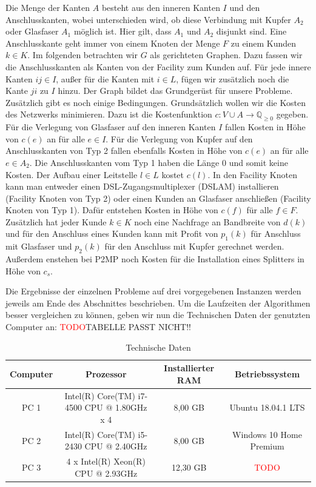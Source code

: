 \documentclass[11pt,a4paper]{article}
\newcommand{\Q}{\mathbb{Q}}
\newcommand{\TODO}{\textcolor{red}{TODO}}
\theoremstyle{my_th_style1}
\begin{document}
Die Menge der Kanten $A$ besteht aus den inneren Kanten $I$ und den Anschlusskanten, wobei unterschieden wird, ob diese Verbindung mit Kupfer $A_2$ oder Glasfaser $A_1$ möglich ist. Hier gilt, dass $A_1$ und $A_2$ disjunkt sind.
Eine Anschlusskante geht immer von einem Knoten der Menge $F$ zu einem Kunden $k \in K$. 
Im folgenden betrachten wir $G$ als gerichteten Graphen. Dazu fassen wir die Anschlusskanten als Kanten von der Facility zum Kunden auf. Für jede innere Kanten $ij \in I$, außer für die Kanten mit $i \in L$, fügen wir zusätzlich noch die Kante $ji$ zu $I$ hinzu.
Der Graph bildet das Grundgerüst für unsere Probleme. Zusätzlich gibt es noch einige Bedingungen. Grundsätzlich wollen wir die Kosten des Netzwerks minimieren. 
Dazu ist die Kostenfunktion $c: V \cup A \rightarrow \Q_{\geq 0}$ gegeben.
Für die Verlegung von Glasfaser auf den inneren Kanten $I$ fallen Kosten in Höhe von $c(e)$ an für alle $e \in I$. 
Für die Verlegung von Kupfer auf den Anschlusskanten von Typ 2 fallen ebenfalls Kosten in Höhe von $c(e)$ an für alle $e \in A_2$. 
Die  Anschlusskanten vom Typ 1 haben die Länge 0 und somit keine Kosten.
Der Aufbau einer Leitstelle $ l\in L$ kostet $c(l)$. 
In den Facility Knoten kann man entweder einen DSL-Zugangsmultiplexer (DSLAM) installieren (Facility Knoten von Typ 2) oder einen Kunden an Glasfaser anschließen (Facility Knoten von Typ 1). Dafür entstehen Kosten in Höhe von $c(f)$ für alle $f \in F$.
Zusätzlich hat jeder Kunde \(k \in K\) noch eine Nachfrage an Bandbreite von $d(k)$ und für den Anschluss eines Kunden kann mit Profit von $p_1(k)$ für Anschluss mit Glasfaser und $p_2(k)$ für den Anschluss mit Kupfer gerechnet werden. Außerdem enstehen bei P2MP noch Kosten für die Installation eines Splitters in H\"ohe von $c_s$.

Die Ergebnisse der einzelnen Probleme auf drei vorgegebenen Instanzen werden jeweils am Ende des Abschnittes beschrieben.
Um die Laufzeiten der Algorithmen besser vergleichen zu können, geben wir nun die Technischen Daten der genutzten Computer an: \TODO TABELLE PASST NICHT!!
\begin{table}[h]
	\centering
	\begin{tabular}{|c|c|c|c|}
		\hline
		Computer & Prozessor & Installierter RAM & Betriebssystem \\	
		\hline
		PC 1 &Intel(R) Core(TM) i7-4500 CPU @ 1.80GHz x 4 & 8,00 GB & Ubuntu 18.04.1 LTS\\
		PC 2 & Intel(R) Core(TM) i5-2430 CPU @ 2.40GHz & 8,00 GB & Windows 10 Home Premium\\
		PC 3 & 4 x Intel(R) Xeon(R) CPU @ 2.93GHz  & 12,30 GB & \TODO\\
		\hline 
	\end{tabular}
	\caption{Technische Daten} 
\end{table}
\end{document}
